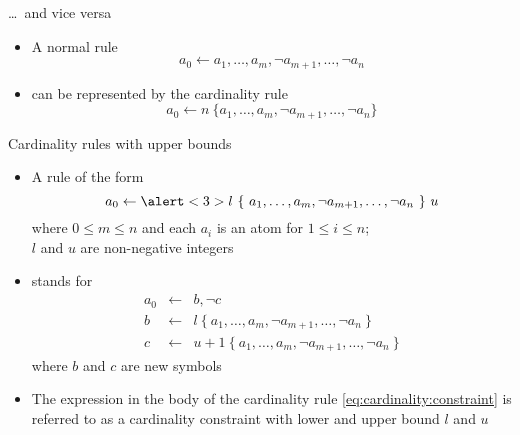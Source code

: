 \begin{frame}{\dots\ and vice versa}
  \begin{itemize}
  \item A normal rule
    \[
    a_0\leftarrow a_1,\dots,a_m, \neg a_{m+1},\dots,\neg a_n
    \]
  \item[] can be represented by the cardinality rule
    \[
    a_0\leftarrow n \ \{a_1,\dots,a_m, \neg a_{m+1},\dots,\neg a_n\}
    \]
  \end{itemize}
\end{frame}
\begin{frame}{Cardinality rules with upper bounds}
  \begin{itemize}
  \item A rule of the form
    \begin{equation}\label{eq:cardinality:constraint}
      a_0\leftarrow \alert<3>{l~\{\ a_1,\dots,a_m,\neg a_{m+1},\dots,\neg a_n\ \}~u}
    \end{equation}
    where $0\leq m\leq n$ and each $a_i$ is an atom for $1\leq i\leq n$;\\
    $l$ and $u$ are non-negative integers
  \item<2-> []
    stands for
    \[
    \begin{array}{rcl}
      a_0 &\leftarrow& b, \neg c\\
      b   &\leftarrow& l~\{\ a_1,\dots,a_m,\neg a_{m+1},\dots,\neg a_n\ \}\\
      c   &\leftarrow& u{+}1~\{\ a_1,\dots,a_m,\neg a_{m+1},\dots,\neg a_n\ \}
    \end{array}
    \]
    where $b$ and $c$ are new symbols
    \medskip
  \item<3-> 
    The expression in the body of the cardinality rule \eqref{eq:cardinality:constraint} is
    referred to as a \alert<3>{cardinality constraint} with lower and upper bound $l$ and $u$
  \end{itemize}
\end{frame}
